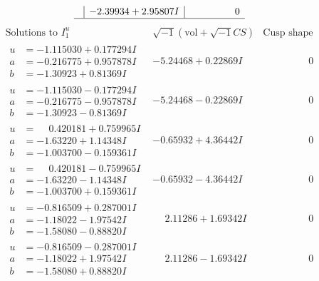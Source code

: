 \documentclass[1p]{elsarticle_modified}
\theoremstyle{definition}
\newcommand{\I}{\sqrt{-1}}
\begin{document}
$$\begin{array}{c|c|c}
 & -2.39934 + 2.95807 I & \phantom{-0.000000 } 0\\
 \hline 
 \end{array}$$\newpage$$\begin{array}{c|c|c}  
\text{Solutions to }I^u_{1}& \I (\text{vol} + \sqrt{-1}CS) & \text{Cusp shape}\\
 \hline 
\begin{aligned}
u &= -1.115030 + 0.177294 I \\
a &= -0.216775 + 0.957878 I \\
b &= -1.30923 + 0.81369 I\end{aligned}
 & -5.24468 + 0.22869 I & \phantom{-0.000000 } 0 \\ \hline\begin{aligned}
u &= -1.115030 - 0.177294 I \\
a &= -0.216775 - 0.957878 I \\
b &= -1.30923 - 0.81369 I\end{aligned}
 & -5.24468 - 0.22869 I & \phantom{-0.000000 } 0 \\ \hline\begin{aligned}
u &= \phantom{-}0.420181 + 0.759965 I \\
a &= -1.63220 + 1.14348 I \\
b &= -1.003700 - 0.159361 I\end{aligned}
 & -0.65932 + 4.36442 I & \phantom{-0.000000 } 0 \\ \hline\begin{aligned}
u &= \phantom{-}0.420181 - 0.759965 I \\
a &= -1.63220 - 1.14348 I \\
b &= -1.003700 + 0.159361 I\end{aligned}
 & -0.65932 - 4.36442 I & \phantom{-0.000000 } 0 \\ \hline\begin{aligned}
u &= -0.816509 + 0.287001 I \\
a &= -1.18022 - 1.97542 I \\
b &= -1.58080 - 0.88820 I\end{aligned}
 & \phantom{-}2.11286 + 1.69342 I & \phantom{-0.000000 } 0 \\ \hline\begin{aligned}
u &= -0.816509 - 0.287001 I \\
a &= -1.18022 + 1.97542 I \\
b &= -1.58080 + 0.88820 I\end{aligned}
 & \phantom{-}2.11286 - 1.69342 I & \phantom{-0.000000 } 0 \\ \hline\begin{aligned}

\end{aligned}
\end{array}$$
\end{document}
